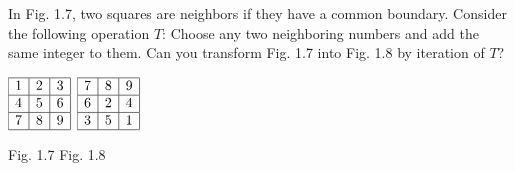 In Fig. 1.7, two squares are neighbors if they have a common boundary. Consider the following operation $T$: Choose any two neighboring numbers and add the same integer to them. Can you transform Fig. 1.7 into Fig. 1.8 by iteration of $T$?
\begin{center}
$\begin{array}{|c|c|c|}\hline 1 & 2 & 3\\\hline 4 & 5 & 6\\\hline 7 & 8 & 9\\\hline\end{array}$ \qquad
$\begin{array}{|c|c|c|}\hline 7 & 8 & 9\\\hline 6 & 2 & 4\\\hline 3 & 5 & 1\\\hline\end{array}$

Fig. 1.7 \qquad\qquad Fig. 1.8
\end{center}

